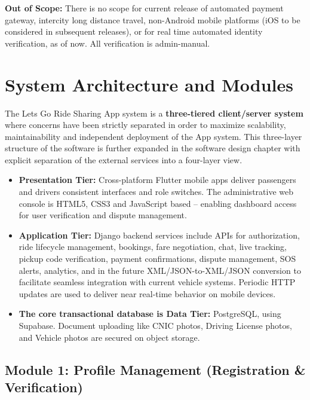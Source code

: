 \textbf{Out of Scope:} There is no scope for current release of automated payment gateway, intercity long distance travel, non-Android mobile platforms (iOS to be considered in subsequent releases), or for real time automated identity verification, as of now. All verification is admin-manual.



\section{System Architecture and Modules}

The Lets Go Ride Sharing App system is a \textbf{three-tiered client/server system} where concerns have been strictly separated in order to maximize scalability, maintainability and independent deployment of the App system. This three-layer structure of the software is further expanded in the software design chapter with explicit separation of the external services into a four-layer view.
\begin{itemize}
    \item \textbf{Presentation Tier:} Cross-platform Flutter mobile apps deliver passengers and drivers consistent interfaces and role switches. The administrative web console is HTML5, CSS3 and JavaScript based – enabling dashboard access for user verification and dispute management.

    \item \textbf{Application Tier:} Django backend services include APIs for authorization, ride lifecycle management, bookings, fare negotiation, chat, live tracking, pickup code verification, payment confirmations, dispute management, SOS alerts, analytics, and in the future XML/JSON-to-XML/JSON conversion to facilitate seamless integration with current vehicle systems. Periodic HTTP updates are used to deliver near real-time behavior on mobile devices.

    \item \textbf{The core transactional database is Data Tier:} PostgreSQL, using Supabase. Document uploading like CNIC photos, Driving License photos, and Vehicle photos are secured on object storage.
\end{itemize}


\subsection{Module 1: Profile Management (Registration \& Verification)}

